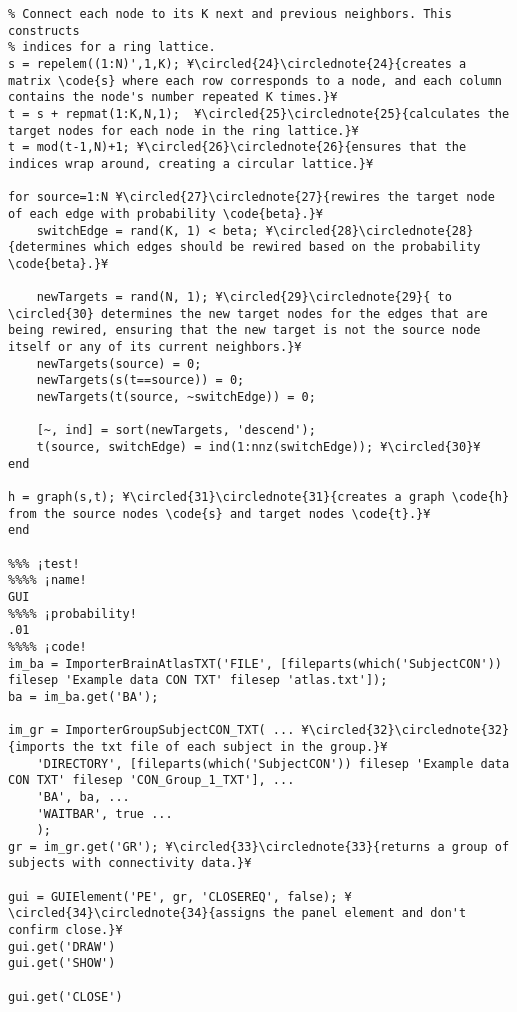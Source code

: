 \documentclass{tufte-handout}
\begin{document}
\begin{lstlisting}
% Connect each node to its K next and previous neighbors. This constructs
% indices for a ring lattice.
s = repelem((1:N)',1,K); ¥\circled{24}\circlednote{24}{creates a matrix \code{s} where each row corresponds to a node, and each column contains the node's number repeated K times.}¥
t = s + repmat(1:K,N,1);  ¥\circled{25}\circlednote{25}{calculates the target nodes for each node in the ring lattice.}¥
t = mod(t-1,N)+1; ¥\circled{26}\circlednote{26}{ensures that the indices wrap around, creating a circular lattice.}¥

for source=1:N ¥\circled{27}\circlednote{27}{rewires the target node of each edge with probability \code{beta}.}¥
    switchEdge = rand(K, 1) < beta; ¥\circled{28}\circlednote{28}{determines which edges should be rewired based on the probability \code{beta}.}¥

    newTargets = rand(N, 1); ¥\circled{29}\circlednote{29}{ to \circled{30} determines the new target nodes for the edges that are being rewired, ensuring that the new target is not the source node itself or any of its current neighbors.}¥
    newTargets(source) = 0;
    newTargets(s(t==source)) = 0; 
    newTargets(t(source, ~switchEdge)) = 0; 
    
    [~, ind] = sort(newTargets, 'descend');
    t(source, switchEdge) = ind(1:nnz(switchEdge)); ¥\circled{30}¥
end

h = graph(s,t); ¥\circled{31}\circlednote{31}{creates a graph \code{h} from the source nodes \code{s} and target nodes \code{t}.}¥
end

%%% ¡test!
%%%% ¡name!
GUI
%%%% ¡probability!
.01
%%%% ¡code!
im_ba = ImporterBrainAtlasTXT('FILE', [fileparts(which('SubjectCON')) filesep 'Example data CON TXT' filesep 'atlas.txt']);
ba = im_ba.get('BA');

im_gr = ImporterGroupSubjectCON_TXT( ... ¥\circled{32}\circlednote{32}{imports the txt file of each subject in the group.}¥
    'DIRECTORY', [fileparts(which('SubjectCON')) filesep 'Example data CON TXT' filesep 'CON_Group_1_TXT'], ...
    'BA', ba, ...
    'WAITBAR', true ...
    );
gr = im_gr.get('GR'); ¥\circled{33}\circlednote{33}{returns a group of subjects with connectivity data.}¥

gui = GUIElement('PE', gr, 'CLOSEREQ', false); ¥\circled{34}\circlednote{34}{assigns the panel element and don't confirm close.}¥
gui.get('DRAW')
gui.get('SHOW')

gui.get('CLOSE')
\end{lstlisting}

\clearpage
\end{document}
